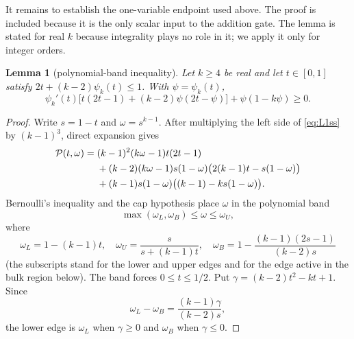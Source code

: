 \documentclass[11pt]{article}
\newtheorem{lemma}[theorem]{Lemma}
\theoremstyle{definition}
\theoremstyle{remark}
\begin{document}
It remains to establish the one-variable endpoint used above.  The proof is
included because it is the only scalar input to the addition gate.  The
lemma is stated for real $k$ because integrality plays no role in it; we
apply it only for integer orders.

\begin{lemma}[polynomial-band inequality]\label{lem:L1ss}
Let $k\ge4$ be real and let $t\in[0,1]$ satisfy
$2t+(k-2)\psi_k(t)\le1$.  With $\psi=\psi_k(t)$,
\begin{equation}\label{eq:L1ss}
 \psi_k'(t)\bigl[t(2t-1)+(k-2)\psi(2t-\psi)\bigr]
 +\psi(1-k\psi)\ge0.
\end{equation}
\end{lemma}

\begin{proof}
Write $s=1-t$ and $\omega=s^{k-1}$.  After multiplying the left
side of \eqref{eq:L1ss} by $(k-1)^3$, direct expansion gives
\begin{align}
 \mathcal P(t,\omega)={}&(k-1)^2(k\omega-1)t(2t-1)\notag\\
 &+(k-2)(k\omega-1)s(1-\omega)\bigl(2(k-1)t-s(1-\omega)\bigr)\notag\\
 &+(k-1)s(1-\omega)\bigl((k-1)-ks(1-\omega)\bigr).
 \label{eq:L1-P}
\end{align}
Bernoulli's inequality and the cap hypothesis place $\omega$ in the
polynomial band
\begin{equation}\label{eq:L1-band}
 \max(\omega_L,\omega_B)\le \omega\le \omega_U,
\end{equation}
where
\[
 \omega_L=1-(k-1)t,\quad
 \omega_U=\frac{s}{s+(k-1)t},\quad
 \omega_B=1-\frac{(k-1)(2s-1)}{(k-2)s}
\]
(the subscripts stand for the lower and upper edges and for the edge
active in the bulk region below).  The band forces $0\le t\le1/2$.  Put
$\gamma=(k-2)t^2-kt+1$.  Since
\[
 \omega_L-\omega_B=\frac{(k-1)\gamma}{(k-2)s},
\]
the lower edge is $\omega_L$ when $\gamma\ge0$ and $\omega_B$ when
$\gamma\le0$.


\end{proof}
\end{document}
